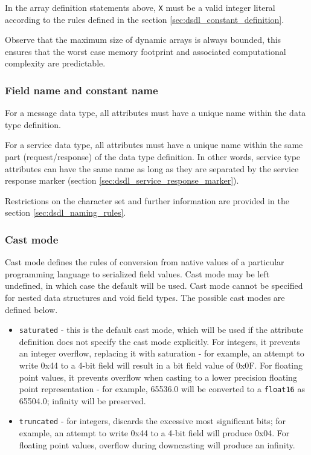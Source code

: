 In the array definition statements above, \verb|X| must be a valid
integer literal according to the rules defined in the section \ref{sec:dsdl_constant_definition}.

Observe that the maximum size of dynamic arrays is always bounded,
this ensures that the worst case memory footprint and associated computational complexity are predictable.

\subsubsection{Field name and constant name}

For a message data type, all attributes must have a unique name within the data type definition.

For a service data type, all attributes must have a unique name within the same part (request/response) of
the data type definition.
In other words, service type attributes can have the same name as long as they are separated by
the service response marker (section \ref{sec:dsdl_service_response_marker}).

Restrictions on the character set and further information are provided in the section \ref{sec:dsdl_naming_rules}.

\subsubsection{Cast mode}

Cast mode defines the rules of conversion from native values of a particular programming language
to serialized field values.
Cast mode may be left undefined, in which case the default will be used.
Cast mode cannot be specified for nested data structures and void field types.
The possible cast modes are defined below.

\begin{itemize}
    \item \verb|saturated| - this is the default cast mode,
          which will be used if the attribute definition does not specify the cast mode explicitly.
          For integers, it prevents an integer overflow, replacing it with saturation -
          for example, an attempt to write 0x44 to a 4-bit field
          will result in a bit field value of 0x0F.
          For floating point values, it prevents overflow when casting to a lower precision floating point
          representation - for example, 65536.0 will be converted to a \verb|float16| as 65504.0;
          infinity will be preserved.
    \item \verb|truncated| - for integers, discards the excessive most significant bits;
          for example, an attempt to write 0x44 to a 4-bit field will produce 0x04.
          For floating point values, overflow during downcasting will produce an infinity.
\end{itemize}

